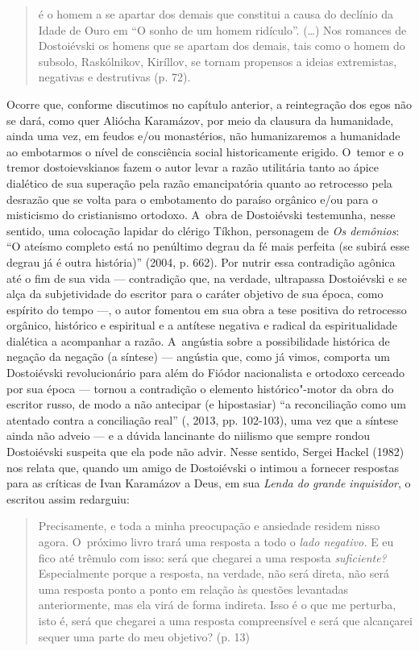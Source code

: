 \begin{quote}
é o homem a se apartar dos demais que constitui a causa do declínio da
Idade de Ouro em ``O sonho de um homem ridículo''. (\ldots) Nos romances de
Dostoiévski os homens que se apartam dos demais, tais como o homem do
subsolo, Raskólnikov, Kiríllov, se tornam propensos a ideias
extremistas, negativas e destrutivas (p. 72).
\end{quote}

Ocorre que, conforme discutimos no capítulo anterior, a reintegração dos
egos não se dará, como quer Aliócha Karamázov, por meio da clausura da
humanidade, ainda uma vez, em feudos e/ou monastérios, não humanizaremos
a humanidade ao embotarmos o nível de consciência social historicamente
erigido. O~temor e o tremor dostoievskianos fazem o autor levar a razão
utilitária tanto ao ápice dialético de sua superação pela razão
emancipatória quanto ao retrocesso pela desrazão que se volta para o
embotamento do paraíso orgânico e/ou para o misticismo do cristianismo
ortodoxo. A~obra de Dostoiévski testemunha, nesse sentido, uma colocação
lapidar do clérigo Tíkhon, personagem de \emph{Os demônios}: ``O ateísmo
completo está no penúltimo degrau da fé mais perfeita (se subirá esse
degrau já é outra história)'' (2004, p. 662). Por nutrir essa
contradição agônica até o fim de sua vida --- contradição que, na
verdade, ultrapassa Dostoiévski e se alça da subjetividade do escritor
para o caráter objetivo de sua época, como espírito do tempo ---, o autor
fomentou em sua obra a tese positiva do retrocesso orgânico, histórico e
espiritual e a antítese negativa e radical da espiritualidade dialética
a acompanhar a razão. A~angústia sobre a possibilidade histórica de
negação da negação (a síntese) --- angústia que, como já vimos, comporta
um Dostoiévski revolucionário para além do Fiódor nacionalista e
ortodoxo cerceado por sua época --- tornou a contradição o elemento
histórico"-motor da obra do escritor russo, de modo a não antecipar (e
hipostasiar) ``a reconciliação como um atentado contra a conciliação
real'' (, 2013, pp. 102-103), uma vez que a síntese ainda não
adveio --- e a dúvida lancinante do niilismo que sempre rondou
Dostoiévski suspeita que ela pode não advir. Nesse sentido, Sergei
Hackel (1982) nos relata que, quando um amigo de Dostoiévski o intimou a
fornecer respostas para as críticas de Ivan Karamázov a Deus, em sua
\emph{Lenda do grande inquisidor}, o escritou assim redarguiu:

\begin{quote}
Precisamente, e toda a minha preocupação e ansiedade residem nisso
agora. O~próximo livro trará uma resposta a todo o \emph{lado negativo.}
E eu fico até trêmulo com isso: será que chegarei a uma resposta
\emph{suficiente?} Especialmente porque a resposta, na verdade, não será
direta, não será uma resposta ponto a ponto em relação às questões
levantadas anteriormente, mas ela virá de forma indireta. Isso é o que
me perturba, isto é, será que chegarei a uma resposta compreensível e
será que alcançarei sequer uma parte do meu objetivo? (p. 13)
\end{quote}

